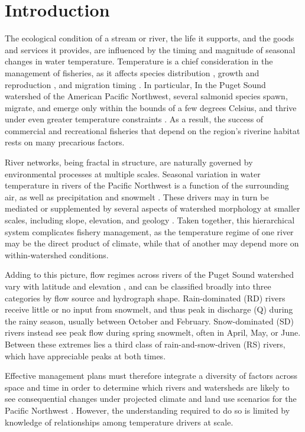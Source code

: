 \documentclass[notitlepage]{article}
\begin{document}
\section*{Introduction}

The ecological condition of a stream or river, the life it supports, and the goods and services it provides, are influenced by the timing and magnitude of seasonal changes in water temperature. Temperature is a chief consideration in the management of fisheries, as it affects species distribution \citep{Boisneau2008}, growth and reproduction \citep{mccullough1999review}, and migration timing \citep{boscarino2007effects}. In particular, In the Puget Sound watershed of the American Pacific Northwest, several salmonid species spawn, migrate, and emerge only within the bounds of a few degrees Celsius, and thrive under even greater temperature constraints \citep{carter2005effects}. As a result, the success of commercial and recreational fisheries that depend on the region's riverine habitat rests on many precarious factors.

River networks, being fractal in structure, are naturally governed by environmental processes at multiple scales. Seasonal variation in water temperature in rivers of the Pacific Northwest is a function of the surrounding air, as well as precipitation and snowmelt \citep{eldridge1967water}. These drivers may in turn be mediated or supplemented by several aspects of watershed morphology at smaller scales, including slope, elevation, and geology \citep{poole2001ecological,lisi2013association}. Taken together, this hierarchical system complicates fishery management, as the temperature regime of one river may be the direct product of climate, while that of another may depend more on within-watershed conditions.

Adding to this picture, flow regimes across rivers of the Puget Sound watershed vary with latitude and elevation \citep{reidy2012hydrogeomorphic,mauger2015CIG}, and can be classified broadly into three categories by flow source and hydrograph shape. Rain-dominated (RD) rivers receive little or no input from snowmelt, and thus peak in discharge (Q) during the rainy season, usually between October and February. Snow-dominated (SD) rivers instead see peak flow during spring snowmelt, often in April, May, or June. Between these extremes lies a third class of rain-and-snow-driven (RS) rivers, which have appreciable peaks at both times.

Effective management plans must therefore integrate a diversity of factors across space and time in order to determine which rivers and watersheds are likely to see consequential changes under projected climate and land use scenarios for the Pacific Northwest \citep{mote2010future,radeloff2012economic}. However, the understanding required to do so is limited by knowledge of relationships among temperature drivers at scale.
\end{document}
